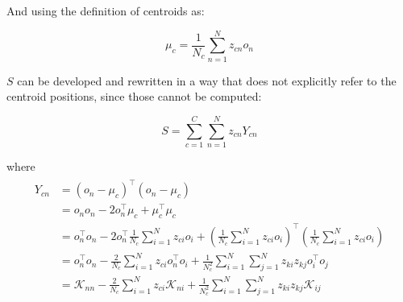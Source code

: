 \documentclass[natbib,smallextended]{svjour3}
\providecommand{\DIFaddbegin}{} %
\providecommand{\DIFaddend}{} %
\providecommand{\DIFdelbegin}{} %
\providecommand{\DIFdelend}{} %
\begin{document}
And using the definition of centroids as:

\[
\mu_c = \frac{1}{N_c}\sum_{n=1}^{N}z_{cn}o_n
\]

$S$ can be developed and rewritten in a way that does not explicitly refer to the centroid positions, since those cannot be computed:

\[
S = \sum_{c=1}^{C} \sum_{n=1}^{N} z_{cn} Y_{cn}
\]

where
\begin{align}
\DIFdelbegin %
\DIFdelend \DIFaddbegin \begin{split}
Y_{cn} & =  \left(o_n-\mu_c\right)^\top\left(o_n-\mu_c\right) \\
       & =  o_no_n - 2 o_n^\top \mu_c + \mu_c^\top \mu_c \\
       & =  o_n^\top o_n - 2 o_n^\top \frac{1}{N_c} \sum_{i=1}^{N} z_{ci} o_i +
       	 \left(\frac{1}{N_c} \sum_{i=1}^{N} z_{ci} o_i\right)^\top
         \left(\frac{1}{N_c} \sum_{i=1}^{N} z_{ci} o_i\right)\\
       & =  o_n^\top o_n - \frac{2}{N_c} \sum_{i=1}^{N} z_{ci} o_n^\top o_i +
       	 \frac{1}{N_c^2} \sum_{i=1}^{N} \sum_{j=1}^{N} z_{ki} z_{kj} o_i^\top o_j \\
       & =  \mathcal{K}_{nn} - \frac{2}{N_c} \sum_{i=1}^{N} z_{ci} \mathcal{K}_{ni} +
         \frac{1}{N_c^2} \sum_{i=1}^{N} \sum_{j=1}^{N} z_{ki} z_{kj} \mathcal{K}_{ij} \label{eq:yki}
\end{split}
\DIFaddend \end{align}
\end{document}
